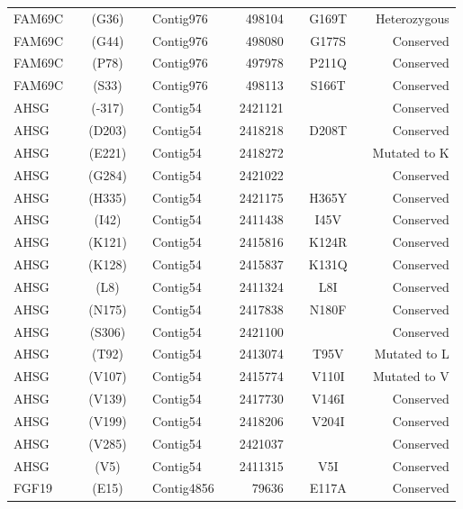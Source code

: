 \begin{center}
\begin{longtable}{lccclcrcccr}
FAM69C   & & (G36)   & & Contig976  & & 498104   & & G169T   & & Heterozygous   \\
FAM69C   & & (G44)   & & Contig976  & & 498080   & & G177S   & & Conserved      \\
FAM69C   & & (P78)   & & Contig976  & & 497978   & & P211Q   & & Conserved      \\
FAM69C   & & (S33)   & & Contig976  & & 498113   & & S166T   & & Conserved      \\
AHSG     & & (-317)  & & Contig54   & & 2421121  & &         & & Conserved      \\
AHSG     & & (D203)  & & Contig54   & & 2418218  & & D208T   & & Conserved      \\
AHSG     & & (E221)  & & Contig54   & & 2418272  & &         & & Mutated to K   \\
AHSG     & & (G284)  & & Contig54   & & 2421022  & &         & & Conserved      \\
AHSG     & & (H335)  & & Contig54   & & 2421175  & & H365Y   & & Conserved      \\
AHSG     & & (I42)   & & Contig54   & & 2411438  & & I45V    & & Conserved      \\
AHSG     & & (K121)  & & Contig54   & & 2415816  & & K124R   & & Conserved      \\
AHSG     & & (K128)  & & Contig54   & & 2415837  & & K131Q   & & Conserved      \\
AHSG     & & (L8)    & & Contig54   & & 2411324  & & L8I     & & Conserved      \\
AHSG     & & (N175)  & & Contig54   & & 2417838  & & N180F   & & Conserved      \\
AHSG     & & (S306)  & & Contig54   & & 2421100  & &         & & Conserved      \\
AHSG     & & (T92)   & & Contig54   & & 2413074  & & T95V    & & Mutated to L   \\
AHSG     & & (V107)  & & Contig54   & & 2415774  & & V110I   & & Mutated to V   \\
AHSG     & & (V139)  & & Contig54   & & 2417730  & & V146I   & & Conserved      \\
AHSG     & & (V199)  & & Contig54   & & 2418206  & & V204I   & & Conserved      \\
AHSG     & & (V285)  & & Contig54   & & 2421037  & &         & & Conserved      \\
AHSG     & & (V5)    & & Contig54   & & 2411315  & & V5I     & & Conserved      \\
FGF19    & & (E15)   & & Contig4856 & & 79636    & & E117A   & & Conserved      \\

\end{longtable}
\end{center}
